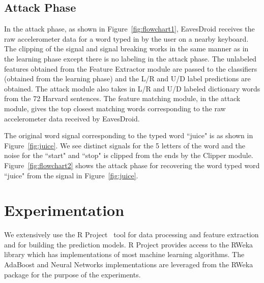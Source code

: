 \documentclass[11pt,conference]{IEEEtran}
\begin{document}
\subsection{Attack Phase}
\label{sec:attacking}
\noindent In the attack phase, as shown in Figure~\ref{fig:flowchart1}, EavesDroid receives the raw accelerometer data for a word
typed in by the user on a nearby keyboard. The clipping of the signal and signal breaking
works in the same manner as in the learning phase except there is no labeling in the attack
phase. The unlabeled features obtained from the Feature Extractor module are passed
to the classifiers (obtained from the learning phase) and the L/R and U/D label predictions
are obtained. The attack module also takes in L/R and U/D labeled dictionary words from the
72 Harvard sentences. The feature matching module, in the attack module, gives the top
closest matching words corresponding to the raw accelerometer data received by EavesDroid.

The original word signal corresponding to the typed word ``juice" is as shown in Figure~\ref{fig:juice}.
We see distinct signals for the 5 letters of the word and the noise for the ``start" and ``stop" is clipped
from the ends by the Clipper module. Figure~\ref{fig:flowchart2} shows the attack phase for recovering
the word typed word ``juice" from the signal in Figure~\ref{fig:juice}.

\section{Experimentation}
\label{sec:experimentation}
\noindent We extensively use the R Project~\cite{r-project} tool for data processing and feature extraction and for building the prediction models. R Project
provides access to the RWeka~\cite{rweka} library which has implementations
of most machine learning algorithms. The AdaBoost and Neural Networks implementations
are leveraged from the RWeka package for the purpose of the experiments.
\end{document}
